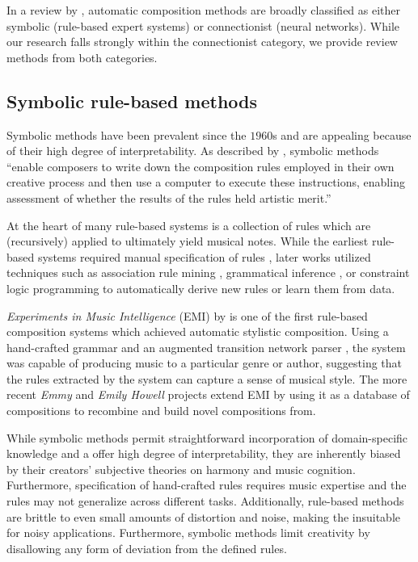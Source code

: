 In a review by \citet{toiviainen2000symbolic}, automatic composition methods
are broadly classified as either symbolic (\eg rule-based expert systems) or
connectionist (\eg neural networks). While our research falls strongly within
the connectionist category, we provide review methods from both categories.

\subsection{Symbolic rule-based methods}

Symbolic methods have been prevalent since the $1960$s
\citep{todd1988sequential} and are appealing because of their high degree of
interpretability. As described by \citet{todd1989connectionist}, symbolic
methods ``enable composers to write down the composition rules employed in
their own creative process and then use a computer to execute these
instructions, enabling assessment of whether the results of the rules held
artistic merit.''

At the heart of many rule-based systems is a collection of rules which are
(recursively) applied to ultimately yield musical notes. While the earliest
rule-based systems required manual specification of rules
\citep{ebciouglu1988expert,cruz1998learning}, later works utilized techniques
such as association rule mining \citep{spangler1998bach}, grammatical inference
\citep{cruz1998learning,quick2014kulitta}, or constraint logic programming
\citep{tsang1991harmonizing} to automatically derive new rules or learn them
from data.

\textit{Experiments in Music Intelligence} (EMI) by
\citet{cope1987experiments,cope1992computer} is one of the first rule-based
composition systems which achieved automatic stylistic composition. Using a
hand-crafted grammar and an augmented transition network
parser \citep{wanner1980atn}, the system was capable of producing music to a
particular genre or author, suggesting that the rules extracted by the system
can capture a sense of musical style. The more recent \textit{Emmy} and
\textit{Emily Howell} projects \citep{cope2013well,cope2010recombinant} extend
EMI by using it as a database of compositions to recombine and build novel
compositions from.

While symbolic methods permit straightforward incorporation of domain-specific
knowledge and a offer high degree of interpretability, they are inherently
biased by their creators' subjective theories on harmony and music cognition.
Furthermore, specification of hand-crafted rules requires music expertise and
the rules may not generalize across different tasks. Additionally, rule-based
methods are brittle to even small amounts of distortion and noise, making the
insuitable for noisy applications. Furthermore, symbolic methods limit
creativity by disallowing any form of deviation from the defined rules.

